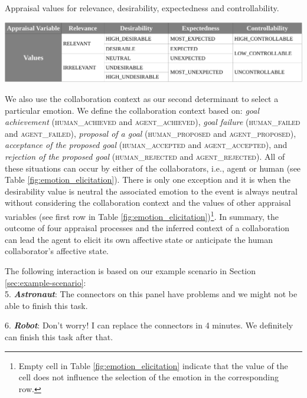 \documentclass[12pt]{report}
\begin{document}
\begin{table}[t]
  \centering
  \caption{Appraisal values for relevance, desirability, expectedness and
  controllability.}
  \label{fig:appraisal_values}
  \vspace*{-3mm}
  \includegraphics[width=1\textwidth]{figure/apraisal_values_croped.pdf}
\end{table}

We also use the collaboration context as our second determinant to select a
particular emotion. We define the collaboration context based on: \textit{goal
achievement} (\textsc{human\_achieved} and \textsc{agent\_achieved}),
\textit{goal failure} (\textsc{human\_failed} and \textsc{agent\_failed}),
\textit{proposal of a goal} (\textsc{human\_proposed} and
\textsc{agent\_proposed}), \textit{acceptance of the proposed goal}
(\textsc{human\_accepted} and \textsc{agent\_accepted}), and \textit{rejection
of the proposed goal} (\textsc{human\_rejected} and \textsc{agent\_rejected}).
All of these situations can occur by either of the collaborators, i.e., agent or
human (see Table \ref{fig:emotion_elicitation}). There is only one exception
and it is when the desirability value is neutral the associated emotion to the
event is always neutral without considering the collaboration context and the
values of other appraisal variables (see first row in Table
\ref{fig:emotion_elicitation})\footnote{Empty cell in Table
\ref{fig:emotion_elicitation} indicate that the value of the cell does not
influence the selection of the emotion in the corresponding row.}.
In summary, the outcome of four appraisal processes and the inferred
context of a collaboration can lead the agent to elicit its own affective state
or anticipate the human collaborator's affective state.

The following interaction is based on our example scenario in
Section \ref{sec:example-scenario}:\\

  5. \textbf{\textit{Astronaut}}: The connectors on this panel have problems and
  we might not be able to finish this task.

  6. \textbf{\textit{Robot}}: Don't worry! I can replace the connectors in 4
  minutes. We definitely can finish this task after that.\\
\end{document}
